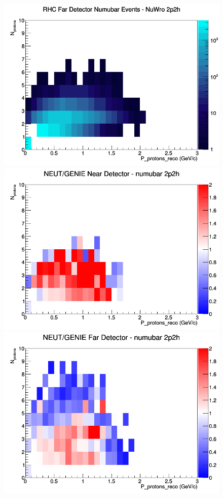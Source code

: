 \begin{figure}[h]
\endminipage
{}
\includegraphics[width=\linewidth]{eff_N_P/FGT/protons/2p2h_RHC_FD_numubar_N_P_NuWro.png}
\endminipage
\newline
{}
\includegraphics[width=\linewidth]{eff_N_P/FGT/protons/ratios/2p2h_NEUT_GENIE_numubar_near_N_P.png}
\endminipage
{}
\includegraphics[width=\linewidth]{eff_N_P/FGT/protons/ratios/2p2h_NEUT_GENIE_numubar_far_N_P.png}

\end{figure}
